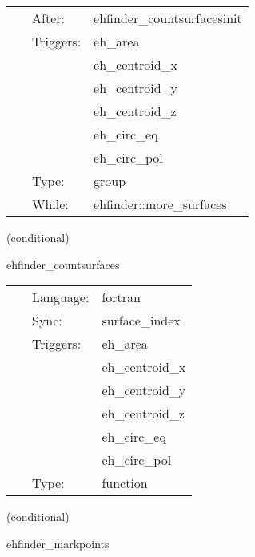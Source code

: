  \begin{tabular*}{160mm}{cll} 
~ & After:  & ehfinder\_countsurfacesinit \\ 
~ & Triggers:  & eh\_area \\ 
~& ~ &eh\_centroid\_x\\ 
~& ~ &eh\_centroid\_y\\ 
~& ~ &eh\_centroid\_z\\ 
~& ~ &eh\_circ\_eq\\ 
~& ~ &eh\_circ\_pol\\ 
~ & Type:  & group \\ 
~ & While:  & ehfinder::more\_surfaces \\ 
\end{tabular*} 


\vspace{5mm}

   (conditional) 

\hspace{5mm} ehfinder\_countsurfaces 

\hspace{5mm}{\it check if there are more surfaces } 


\hspace{5mm}

 \begin{tabular*}{160mm}{cll} 
~ & Language:  & fortran \\ 
~ & Sync:  & surface\_index \\ 
~ & Triggers:  & eh\_area \\ 
~& ~ &eh\_centroid\_x\\ 
~& ~ &eh\_centroid\_y\\ 
~& ~ &eh\_centroid\_z\\ 
~& ~ &eh\_circ\_eq\\ 
~& ~ &eh\_circ\_pol\\ 
~ & Type:  & function \\ 
\end{tabular*} 


\vspace{5mm}

   (conditional) 

\hspace{5mm} ehfinder\_markpoints 

\hspace{5mm}{\it marking surfaces } 


\hspace{5mm}

